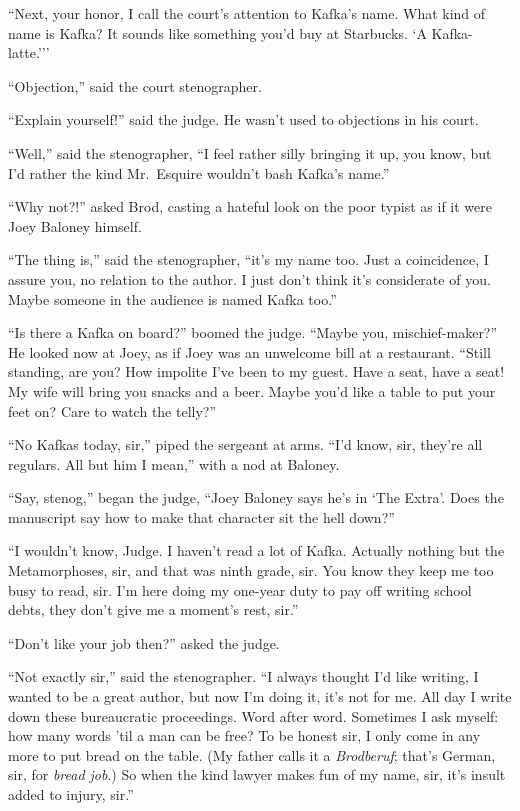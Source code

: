 \documentclass[oneside]{book}
\begin{document}
``Next, your honor, I call the court's attention to Kafka's name.
What kind of name is Kafka?  It sounds like
something you'd buy at Starbucks.  `A
Kafka-latte.{'}''

``Objection,'' said the court stenographer.

``Explain yourself!'' said the judge.  He wasn't used to objections in his court.

``Well,'' said the stenographer, ``I feel rather silly bringing it up, you know,
but I'd rather the kind Mr.~Esquire wouldn't bash Kafka's name.''

``Why not?!'' asked Brod, casting a hateful look on the poor typist as if it were Joey Baloney
himself.

``The thing is,'' said the stenographer, ``it's my name too.  Just a coincidence,
I assure you, no relation to the author.  I just don't think it's considerate
of you.  Maybe someone in the audience is named Kafka too.''

``Is there a Kafka on board?'' boomed the judge.
``Maybe you, mischief-maker?'' He looked now at Joey, as if Joey was an unwelcome bill at a restaurant.
``Still standing, are you?  How impolite I've been to my guest.  Have a seat, have a seat!  My wife will bring you snacks and
a beer.  Maybe you'd like a table to put your feet on?  Care to watch the telly?''

``No Kafkas today, sir,'' piped the sergeant at arms.  ``I'd know, sir, they're all regulars.
All but him I mean,'' with a nod at Baloney.

``Say, stenog,'' began the judge, ``Joey Baloney says he's in `The Extra'.  Does the manuscript
say how to make that character sit the hell down?''

``I wouldn't know, Judge.  I haven't read a lot of Kafka.  Actually nothing but the Metamorphoses, sir,
and that was ninth grade, sir.  You know they keep me too busy to read, sir.  I'm here doing my one-year
duty to pay off writing school debts, they don't give me a moment's rest, sir.''

``Don't like your job then?'' asked the judge.

``Not exactly sir,'' said the stenographer.
``I always thought I'd like writing, I wanted to be a great author, but now I'm doing it,
it's not for me.  All day I write down these bureaucratic proceedings.  Word after word.
Sometimes I ask myself: how many words 'til a man can be free?
To be honest sir, I only
come in any more to put bread on the table.  (My father calls it a \emph{Brodberuf}; that's
German, sir, for \emph{bread job}.)
So when the kind lawyer makes fun of my name, sir, it's insult added to
injury, sir.''
\end{document}
